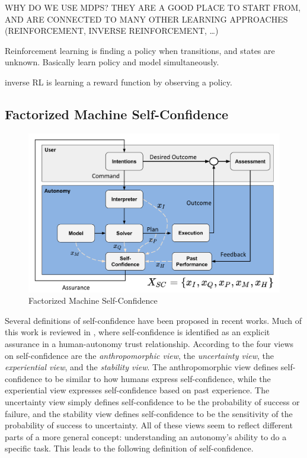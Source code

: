     WHY DO WE USE MDPS? THEY ARE A GOOD PLACE TO START FROM, AND ARE CONNECTED TO MANY OTHER LEARNING APPROACHES (REINFORCEMENT, INVERSE REINFORCEMENT, \ldots)

    Reinforcement learning is finding a policy when transitions, and states are unknown. Basically learn policy and model simultaneously.

    inverse RL is learning a reward function by observing a policy.

\subsection{Factorized Machine Self-Confidence}
    \begin{figure}[tbp]
        \centering
        \includegraphics[width=0.65\linewidth]{Figures/SC_flowchart.pdf}
        \caption{Factorized Machine Self-Confidence}
        \label{fig:famsec}
    \end{figure}

    Several definitions of self-confidence have been proposed in recent works. Much of this work is reviewed in \cite{Israelsen2017-ym}, where self-confidence is identified as an explicit assurance in a human-autonomy trust relationship. According to \cite{Sweet2016-tz} the four views on self-confidence are the \textit{anthropomorphic view}, the \textit{uncertainty view}, the \textit{experiential view}, and the \textit{stability view}. The anthropomorphic view defines self-confidence to be similar to how humans express self-confidence, while the experiential view expresses self-confidence based on past experience. The uncertainty view simply defines self-confidence to be the probability of success or failure, and the stability view defines self-confidence to be the sensitivity of the probability of success to uncertainty. All of these views seem to reflect different parts of a more general concept: understanding an autonomy's ability to do a specific task. This leads to the following definition of self-confidence.

